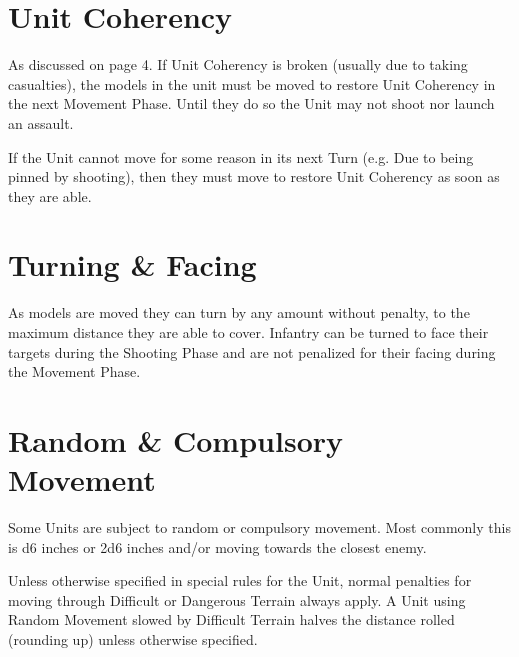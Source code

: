 \section{Unit Coherency}
As discussed on page 4. If Unit Coherency is broken (usually due
to taking casualties), the models in the unit must be moved to
restore Unit Coherency in the next Movement Phase. Until they do
so the Unit may not shoot nor launch an assault.

If the Unit cannot move for some reason in its next Turn (e.g. Due
to being pinned by shooting), then they must move to restore Unit
Coherency as soon as they are able.

\section{Turning \& Facing}
As models are moved they can turn by any amount without
penalty, to the maximum distance they are able to cover. Infantry
can be turned to face their targets during the Shooting Phase and
are not penalized for their facing during the Movement Phase.

\section{Random \& Compulsory \\Movement}
Some Units are subject to random or compulsory movement. Most
commonly this is d6 inches or 2d6 inches and/or moving towards
the closest enemy.

Unless otherwise specified in special rules for the Unit, normal
penalties for moving through Difficult or Dangerous Terrain
always apply. A Unit using Random Movement slowed by Difficult
Terrain halves the distance rolled (rounding up) unless otherwise
specified.